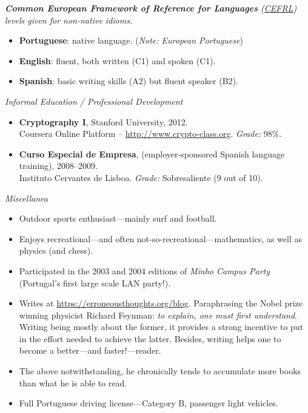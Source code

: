 \documentclass[a4paper,10pt]{extarticle}
\newenvironment{topic}[1]
   {{\noindent\large\bfseries\raisebox{0pt}[\height][1ex]{#1}\hrule\par}%
    \begin{list}{}{%
       \setlength{\leftmargin}{.0cm}}\item[]}
   {\end{list}\medskip}
\begin{document}
\begin{topic}{Languages}
  {\hspace*{2em} \slshape \small \textbf{Common European Framework of Reference for Languages} 
	(\href{http://en.wikipedia.org/wiki/Common\_European\_Framework\_of\_Reference\_for\_Languages#Common\_reference\_levels}{CEFRL}) 
	levels given for non-native idioms.}
  \begin{itemize}[leftmargin=*]
    \item {\bfseries Portuguese}: native language. (\emph{Note: European Portuguese})
    \item {\bfseries English}: fluent, both written (C1) and spoken (C1).
    \item {\bfseries Spanish}: basic writing skills (A2) but fluent speaker (B2).
  \end{itemize}
\end{topic}

\begin{topic}{Additional Information}
  {\hspace*{2em} \itshape Informal Education / Professional Development}
  \begin{itemize}[leftmargin=*]
    \item {\bfseries Cryptography I}, Stanford University, 2012.\\
      Coursera Online Platform -- \url{http://www.crypto-class.org}. \emph{Grade:} 98\%.
    \item {\bfseries Curso Especial de Empresa}, (employer-sponsored Spanish language training), 2008--2009.\\
			Instituto Cervantes de Lisboa. \emph{Grade:} Sobresaliente (9 out of 10).
  \end{itemize}
  {\hspace*{2em} \itshape Miscellanea}  
  \begin{itemize}[leftmargin=*]
    \item{Outdoor sports enthusiast---mainly surf and football.}
    \item{Enjoys recreational---and often not-so-recreational---mathematics,
      as well as physics (and chess).}
    \item{Participated in the 2003 and 2004 editions of \emph{Minho Campus
			Party} (Portugal's first large scale LAN party!).}
		\item Writes at \url{https://erroneousthoughts.org/blog}. Paraphrasing the 
			Nobel prize winning physicist Richard Feynman: \emph{to explain, one must 
			first understand}. Writing being mostly about the former, it provides a 
			strong incentive to put in the effort needed to achieve the latter. 
			Besides, writing helps one to become a better---and faster!---reader.
    \item The above notwithstanding, he chronically tends to accumulate more books than 
      what he is able to read.
    \item{Full Portuguese driving license---Category B, passenger light
      vehicles.}
  \end{itemize}
\end{topic}
\end{document}
